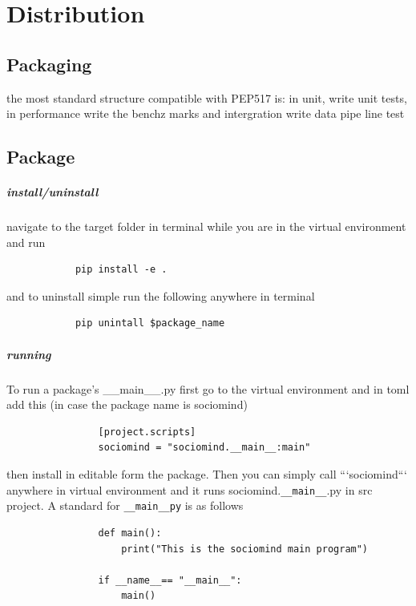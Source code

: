 \chapter{Distribution}
\section{Packaging}
    the most standard structure compatible with PEP517 is:
    in unit, write unit tests, in performance write the benchz marks and intergration write data pipe line test
    
\section{Package}
    \paragraph{install/uninstall}
        navigate to the target folder in terminal while you are in the virtual environment and run
        \begin{verbatim}
            pip install -e .
        \end{verbatim}
        and to uninstall simple run the following anywhere in terminal
        \begin{verbatim}
            pip unintall $package_name
        \end{verbatim}
    \paragraph{running}
        To run a package's \_\_main\_\_.py first go to the virtual environment and  in toml add this (in case the package name is sociomind)
            \begin{verbatim}
                [project.scripts]
                sociomind = "sociomind.__main__:main"
            \end{verbatim}
            then install in editable form the package. Then you can  simply call ```sociomind``` anywhere in virtual environment and it runs sociomind.\texttt{\_\_main\_\_}.py in src project. A standard for \texttt{\_\_main\_\_py} is as follows
            \begin{verbatim}
                def main():
                    print("This is the sociomind main program")
                
                if __name__== "__main__":
                    main()
            \end{verbatim}
            

